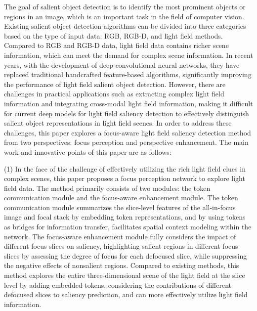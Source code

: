 \begin{englishabstract}	
	
The goal of salient object detection is to identify the most prominent objects or regions in an image, which is an important task in the field of computer vision. Existing salient object detection algorithms can be divided into three categories based on the type of input data: RGB, RGB-D, and light field methods. Compared to RGB and RGB-D data, light field data contains richer scene information, which can meet the demand for complex scene information. In recent years, with the development of deep convolutional neural networks, they have replaced traditional handcrafted feature-based algorithms, significantly improving the performance of light field salient object detection. 
However, there are challenges in practical applications such as extracting complex light field information and integrating cross-modal light field information, making it difficult for current deep models for light field saliency detection to effectively distinguish salient object representations in light field scenes. In order to address these challenges, this paper explores a focus-aware light field saliency detection method from two perspectives: focus perception and perspective enhancement. The main work and innovative points of this paper are as follows: 


	
(1)
In the face of the challenge of effectively utilizing the rich light field clues in complex scenes, this paper proposes a focus perception network to explore light field data. The method primarily consists of two modules: the token communication module and the focus-aware enhancement module. The token communication module summarizes the slice-level features of the all-in-focus image and focal stack by embedding token representations, and by using tokens as bridges for information transfer, facilitates spatial context modeling within the network. The focus-aware enhancement module fully considers the impact of different focus slices on saliency, highlighting salient regions in different focus slices by assessing the degree of focus for each defocused slice, while suppressing the negative effects of nonsalient regions. Compared to existing methods, this method explores the entire three-dimensional scene of the light field at the slice level by adding embedded tokens, considering the contributions of different defocused slices to saliency prediction, and can more effectively utilize light field information. 



\end{englishabstract}
